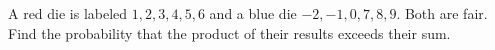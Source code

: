 A red die is labeled $1,2,3,4,5,6$ and a blue die $-2,-1,0,7,8,9$. Both are fair. Find the probability that the product of their results exceeds their sum.
